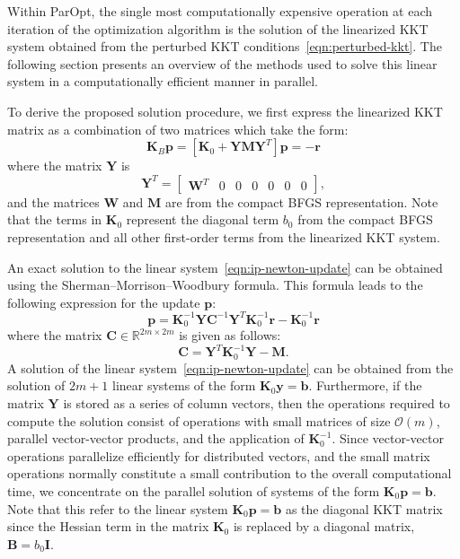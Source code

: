 \documentclass[12pt]{article}
\newcommand{\mb}{\mathbf}
\begin{document}
Within ParOpt, the single most computationally expensive operation at each iteration of the optimization algorithm is the solution of the linearized KKT system obtained from the perturbed KKT conditions~\eqref{eqn:perturbed-kkt}. 
The following section presents an overview of the methods used to solve this linear system in a computationally efficient manner in parallel. 

To derive the proposed solution procedure, we first express the linearized KKT matrix as a combination of two matrices which take the form:
%
\begin{equation}
  \label{eqn:ip-newton-update}
  \mb{K}_{B} \mb{p} = \left[ \mb{K}_{0} + \mb{Y} \mb{M} \mb{Y}^{T} \right] \mb{p} = - \mb{r}
\end{equation}
where the matrix $\mb{Y}$ is
%
\begin{equation*}
  \mb{Y}^{T} = \begin{bmatrix} \mb{W}^T & 0 & 0 & 
    0 & 0 & 0 & 0 \end{bmatrix}, 
\end{equation*}
and the matrices $\mb{W}$ and $\mb{M}$ are from the compact BFGS representation.
Note that the terms in $\mb{K}_{0}$ represent the diagonal term $b_{0}$ from the compact BFGS representation and all other first-order terms from the linearized KKT system.

An exact solution to the linear system~\eqref{eqn:ip-newton-update} can be obtained using the Sherman--Morrison--Woodbury formula.  
This formula leads to the following expression for the update $\mb{p}$:
\begin{equation*}
  \mb{p} = \mb{K}^{-1}_{0} \mb{Y} \mb{C}^{-1} \mb{Y}^{T} \mb{K}_{0}^{-1} \mb{r} - \mb{K}_{0}^{-1} \mb{r}  
\end{equation*}
where the matrix $\mb{C} \in \mathbb{R}^{2m \times 2m}$ is given as
follows:
\begin{equation*}
  \mb{C} = \mb{Y}^{T} \mb{K}_{0}^{-1}\mb{Y} - \mb{M}.
\end{equation*}
A solution of the linear system~\eqref{eqn:ip-newton-update} can be obtained from the solution of $2m+1$ linear systems of the form $\mb{K}_{0}\mb{y} = \mb{b}$.  
Furthermore, if the matrix $\mb{Y}$ is stored as a series of column vectors, then the operations required to compute the solution consist of operations with small matrices of size $\mathcal{O}(m)$, parallel vector-vector products, and the application of $\mb{K}_{0}^{-1}$. 
Since vector-vector operations parallelize efficiently for distributed vectors, and the small matrix operations normally constitute a small contribution to the overall computational time, we concentrate on the parallel solution of systems of the form $\mb{K}_{0} \mb{p} =
\mb{b}$. 
Note that this refer to the linear system $\mb{K}_{0} \mb{p} = \mb{b}$ as the diagonal KKT matrix since the Hessian term in the matrix $\mb{K}_{0}$ is replaced by a diagonal matrix, $\mb{B} = b_{0}\mb{I}$.
\end{document}
